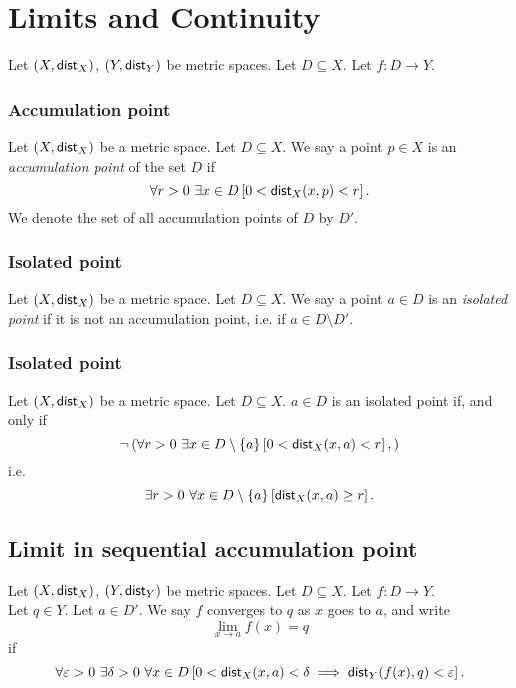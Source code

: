 \section{Limits and Continuity}

Let $(X, \mathsf{dist}_X)$, $(Y, \mathsf{dist}_Y)$ be metric spaces.
Let $D \subseteq X$. Let $f : D \to Y$.\\

\subsubsection*{Accumulation point}
Let $(X, \mathsf{dist}_X)$ be a metric space. Let $D \subseteq X$.
We say a point $p \in X$ is an \emph{accumulation point} of the set $D$ if
\[
    \forall r > 0\ \exists x \in D
        \left[ 0 < \mathsf{dist}_X(x,p) < r \right].
\]
We denote the set of all accumulation points of $D$ by $D'$.

\subsubsection*{Isolated point}
Let $(X, \mathsf{dist}_X)$ be a metric space. Let $D \subseteq X$.
We say a point $a \in D$ is an \emph{isolated point} if
it is not an accumulation point, i.e. if $a \in D \setminus D'$.

\subsubsection*{Isolated point}
\uprop Let $(X, \mathsf{dist}_X)$ be a metric space. Let $D \subseteq X$.
$a \in D$ is an isolated point if, and only if
\[
    \neg \left(
        \forall r > 0\ \exists x \in D \setminus \{a\}
            \left[ 0 < \mathsf{dist}_X(x,a) < r \right],
    \right)
\]
i.e.
\[
    \exists r > 0\ \forall x \in D \setminus \{a\}
        \left[ \dist_X(x,a) \geq r \right].
\]


\subsection{Limit in sequential accumulation point}
\udef Let $(X, \mathsf{dist}_X)$, $(Y, \mathsf{dist}_Y)$ be metric spaces.
Let $D \subseteq X$. Let $f : D \to Y$.\\
Let $q \in Y$. Let $a \in D'$. We say $f$ converges to $q$ as $x$ goes to $a$,
and write
\[
    \lim_{x \to a} f(x) = q
\]
if
\[
    \forall \varepsilon > 0\ \exists \delta > 0\ \forall x \in D
        \left[ 0 < \mathsf{dist}_X(x,a) < \delta \implies \mathsf{dist}_Y(f(x),q) < \varepsilon \right].
\]

